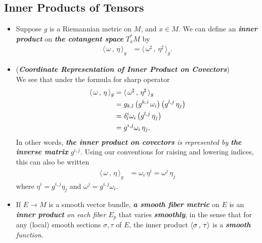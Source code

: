 \documentclass[11pt]{article}
\begin{document}
\subsection{Inner Products of Tensors}
\begin{itemize}
\item \begin{definition}
Suppose $g$ is a Riemannian metric on $M$, and $x \in M$. We can define an \emph{\textbf{inner product}} on \emph{\textbf{the cotangent space}} $T_{x}^{*}M$ by
\begin{align*}
\langle\,\omega\,,\,\eta\,\rangle_g &= \langle\,\omega^{\sharp}\,,\,\eta^{\sharp}\,\rangle_g.
\end{align*}
\end{definition}

\item \begin{remark} (\emph{\textbf{Coordinate Representation of Inner Product on Covectors}})\\
We see that under the formula for sharp operator
\begin{align*}
\langle\,\omega\,,\,\eta\,\rangle_g &= \langle\,\omega^{\sharp}\,,\,\eta^{\sharp}\,\rangle_g\\
&= g_{k,l}\left(g^{k,i}\,\omega_{i}\right)\left(g^{l,j}\,\eta_{j}\right)\\
&= \delta_{l}^{i}\omega_i\left(g^{l,j}\,\eta_{j}\right) \\
&= g^{i,j}\omega_{i}\,\eta_{j}.
\end{align*} In other words, \emph{\textbf{the inner product on covectors} is represented by \textbf{the inverse matrix} $g^{i,j}$}. Using our conventions for raising and lowering indices, this can also be written
\begin{align*}
\langle\,\omega\,,\,\eta\,\rangle_g &= \omega_{i}\,\eta^{i} = \omega^{j}\, \eta_{j}
\end{align*}
where $\eta^{i} = g^{i,j}\eta_{j}$ and $\omega^j = g^{i,j}\omega_{i}$.
\end{remark}

\item \begin{definition}
If $E \rightarrow M$ is a smooth vector bundle, \emph{\textbf{a smooth fiber metric}} on $E$ is an \emph{\textbf{inner product} on each fiber} $E_p$ that varies \emph{\textbf{smoothly}}, in the sense that for any (local) smooth sections $\sigma, \tau$ of $E$, the inner product $\left\langle \sigma\,,\, \tau \right\rangle$ is a \emph{\textbf{smooth} function}.
\end{definition}


\end{itemize}
\end{document}
